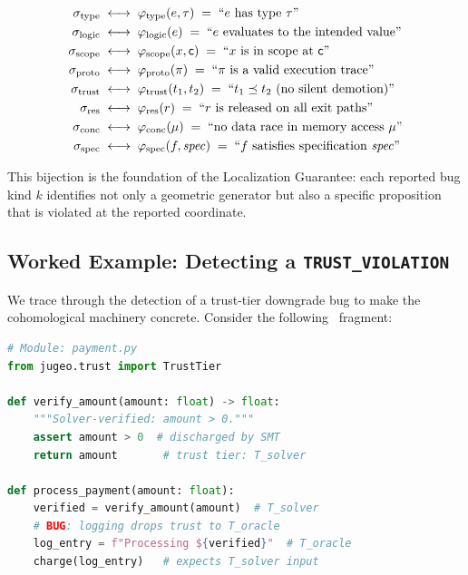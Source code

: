 \documentclass[11pt]{article}
\newcommand{\bugtype}{\sigma_{\mathrm{type}}}     %
\newcommand{\buglogic}{\sigma_{\mathrm{logic}}}   %
\newcommand{\bugscope}{\sigma_{\mathrm{scope}}}   %
\newcommand{\bugproto}{\sigma_{\mathrm{proto}}}   %
\newcommand{\bugtrust}{\sigma_{\mathrm{trust}}}   %
\newcommand{\bugres}{\sigma_{\mathrm{res}}}       %
\newcommand{\bugconc}{\sigma_{\mathrm{conc}}}     %
\newcommand{\bugspec}{\sigma_{\mathrm{spec}}}     %
\begin{document}
\begin{align*}
  \bugtype  &\;\longleftrightarrow\; \varphi_{\mathrm{type}}(e,\tau)
    \;=\; \text{``$e$ has type $\tau$''}\\
  \buglogic &\;\longleftrightarrow\; \varphi_{\mathrm{logic}}(e)
    \;=\; \text{``$e$ evaluates to the intended value''}\\
  \bugscope &\;\longleftrightarrow\; \varphi_{\mathrm{scope}}(x,\coord)
    \;=\; \text{``$x$ is in scope at $\coord$''}\\
  \bugproto &\;\longleftrightarrow\; \varphi_{\mathrm{proto}}(\pi)
    \;=\; \text{``$\pi$ is a valid execution trace''}\\
  \bugtrust &\;\longleftrightarrow\; \varphi_{\mathrm{trust}}(t_1,t_2)
    \;=\; \text{``$t_1 \tleq t_2$ (no silent demotion)''}\\
  \bugres   &\;\longleftrightarrow\; \varphi_{\mathrm{res}}(r)
    \;=\; \text{``$r$ is released on all exit paths''}\\
  \bugconc  &\;\longleftrightarrow\; \varphi_{\mathrm{conc}}(\mu)
    \;=\; \text{``no data race in memory access $\mu$''}\\
  \bugspec  &\;\longleftrightarrow\; \varphi_{\mathrm{spec}}(f,\mathit{spec})
    \;=\; \text{``$f$ satisfies specification $\mathit{spec}$''}
\end{align*}

This bijection is the foundation of the Localization Guarantee: each
reported bug kind $k$ identifies not only a geometric generator but also
a specific proposition that is violated at the reported coordinate.

\subsection{Worked Example: Detecting a \texttt{TRUST\_VIOLATION}}\label{subsec:trust-example}

We trace through the detection of a trust-tier downgrade bug to make
the cohomological machinery concrete.  Consider the following
\Python\ fragment:

\begin{lstlisting}[language=Python, caption={A trust-violation bug: solver-verified data is silently
  demoted to oracle trust.}]
# Module: payment.py
from jugeo.trust import TrustTier

def verify_amount(amount: float) -> float:
    """Solver-verified: amount > 0."""
    assert amount > 0  # discharged by SMT
    return amount       # trust tier: T_solver

def process_payment(amount: float):
    verified = verify_amount(amount)  # T_solver
    # BUG: logging drops trust to T_oracle
    log_entry = f"Processing ${verified}"  # T_oracle
    charge(log_entry)   # expects T_solver input
\end{lstlisting}
\end{document}

